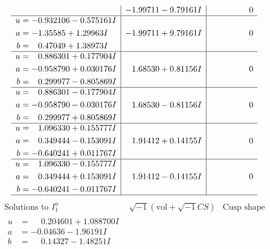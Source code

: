 \documentclass[1p]{elsarticle_modified}
\theoremstyle{definition}
\newcommand{\I}{\sqrt{-1}}
\begin{document}
$$\begin{array}{c|c|c}
 & -1.99711 - 9.79161 I & \phantom{-0.000000 } 0 \\ \hline\begin{aligned}
u &= -0.932106 - 0.575161 I \\
a &= -1.35585 + 1.29963 I \\
b &= \phantom{-}0.47049 + 1.38973 I\end{aligned}
 & -1.99711 + 9.79161 I & \phantom{-0.000000 } 0 \\ \hline\begin{aligned}
u &= \phantom{-}0.886301 + 0.177904 I \\
a &= -0.958790 + 0.030176 I \\
b &= \phantom{-}0.299977 - 0.805869 I\end{aligned}
 & \phantom{-}1.68530 + 0.81156 I & \phantom{-0.000000 } 0 \\ \hline\begin{aligned}
u &= \phantom{-}0.886301 - 0.177904 I \\
a &= -0.958790 - 0.030176 I \\
b &= \phantom{-}0.299977 + 0.805869 I\end{aligned}
 & \phantom{-}1.68530 - 0.81156 I & \phantom{-0.000000 } 0 \\ \hline\begin{aligned}
u &= \phantom{-}1.096330 + 0.155777 I \\
a &= \phantom{-}0.349444 - 0.153091 I \\
b &= -0.640241 + 0.011767 I\end{aligned}
 & \phantom{-}1.91412 + 0.14155 I & \phantom{-0.000000 } 0 \\ \hline\begin{aligned}
u &= \phantom{-}1.096330 - 0.155777 I \\
a &= \phantom{-}0.349444 + 0.153091 I \\
b &= -0.640241 - 0.011767 I\end{aligned}
 & \phantom{-}1.91412 - 0.14155 I & \phantom{-0.000000 } 0\\
 \hline 
 \end{array}$$\newpage$$\begin{array}{c|c|c}  
\text{Solutions to }I^u_{1}& \I (\text{vol} + \sqrt{-1}CS) & \text{Cusp shape}\\
 \hline 
\begin{aligned}
u &= \phantom{-}0.204601 + 1.088700 I \\
a &= -0.04636 - 1.96191 I \\
b &= \phantom{-}0.14327 - 1.48251 I\end{aligned}

\end{array}$$
\end{document}
